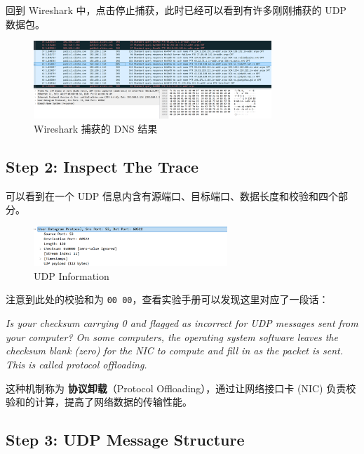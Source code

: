 \documentclass[14pt,a4paper,UTF8,twoside]{article}
\begin{document}
回到 Wireshark 中，点击停止捕获，此时已经可以看到有许多刚刚捕获的 UDP 数据包。

\begin{figure}[H]
    \centering
    \includegraphics[width=0.8\textwidth]{lab5/dnsresult.png}
    \caption{Wireshark 捕获的 DNS 结果}
\end{figure}

\subsection{Step 2: Inspect The Trace}

可以看到在一个 UDP 信息内含有源端口、目标端口、数据长度和校验和四个部分。

\begin{figure}[H]
    \centering
    \includegraphics[width=0.65\textwidth]{lab5/udp.png}
    \caption{UDP Information}
\end{figure}

注意到此处的校验和为 \texttt{00 00}，查看实验手册可以发现这里对应了一段话：

\begin{mdframed}[backgroundcolor=gray!10, linewidth=0.5pt, roundcorner=5pt]
\textit{Is your checksum carrying 0 and flagged as incorrect for UDP messages sent from your computer? On some computers, the operating system software leaves the checksum blank (zero) for the NIC to compute and fill in as the packet is sent. This is called protocol offloading.}
\end{mdframed}

\noindent 这种机制称为 \textbf{协议卸载}（Protocol Offloading），通过让网络接口卡 (NIC) 负责校验和的计算，提高了网络数据的传输性能。

\subsection{Step 3: UDP Message Structure}
\end{document}
